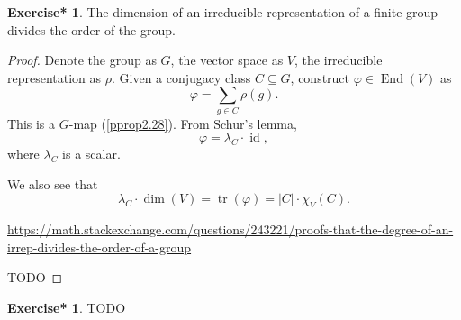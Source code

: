 \documentclass[12pt, letterpaper]{article}
\newcommand{\End}{\operatorname{End}}
\newcommand{\idt}{\operatorname{id}}
\newcommand{\red}[1]{{\color{red} #1}}
\newcommand{\card}[1]{\left\lvert #1 \right\rvert}
\DeclareMathOperator{\tr}{tr}
\theoremstyle{definition}
\theoremstyle{remark}
\theoremstyle{definition}
\newtheorem{exe*}[exe]{Exercise*}
\theoremstyle{plain}
\numberwithin{equation}{section}
\begin{document}
	\begin{exe*}
		The dimension of an irreducible representation of 
		a finite group divides the order of the group.
	\end{exe*}
	\begin{proof}
		Denote the group as $G$, the vector space as $V$, the irreducible representation as $\rho$.
		Given a conjugacy class $C\subseteq G$,
		construct $\varphi\in\End(V)$ as \[\varphi=\sum_{g\in C}\rho(g).\]
		This is a $G$-map (\ref{pprop2.28}).
		From Schur's lemma,
		\[\varphi = \lambda_C \cdot \idt, \]
		where $\lambda_C$ is a scalar.
		
		We also see that
		\[\lambda_C\cdot \dim (V )= \tr(\varphi) = \card{C}\cdot \chi_V(C).\]

		\url{https://math.stackexchange.com/questions/243221/proofs-that-the-degree-of-an-irrep-divides-the-order-of-a-group}

		\red{TODO}
	\end{proof}
	\begin{exe*}
		\red{TODO}
	\end{exe*}
\end{document}
